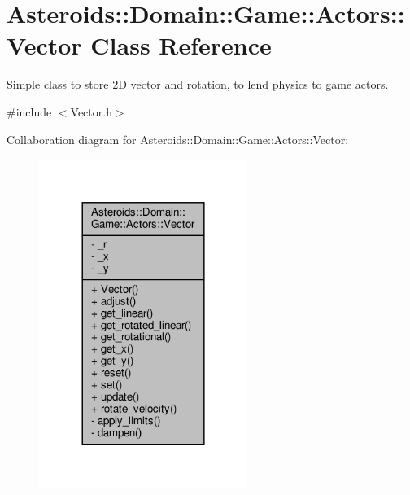 \hypertarget{classAsteroids_1_1Domain_1_1Game_1_1Actors_1_1Vector}{}\section{Asteroids\+:\+:Domain\+:\+:Game\+:\+:Actors\+:\+:Vector Class Reference}
\label{classAsteroids_1_1Domain_1_1Game_1_1Actors_1_1Vector}


Simple class to store 2D vector and rotation, to lend physics to game actors.  




{\ttfamily \#include $<$Vector.\+h$>$}



Collaboration diagram for Asteroids\+:\+:Domain\+:\+:Game\+:\+:Actors\+:\+:Vector\+:\nopagebreak
\begin{figure}[H]
\begin{center}
\leavevmode
\includegraphics[width=192pt]{classAsteroids_1_1Domain_1_1Game_1_1Actors_1_1Vector__coll__graph}
\end{center}
\end{figure}

